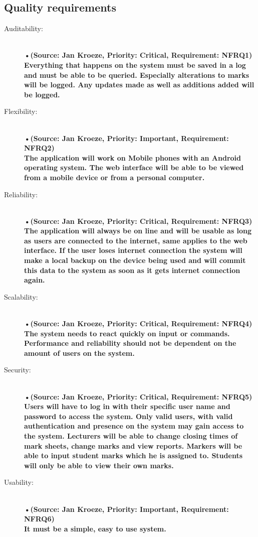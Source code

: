 \documentclass[12pt]{article}
\begin{document}
  \subsection{Quality requirements}
\begin{description}
  \item[Auditability:] \hfill  \\
  \textbf{•(Source: Jan Kroeze, Priority: Critical, Requirement: NFRQ1) \\
  Everything that happens on the system must be saved in a log and must be able to be queried. Especially alterations to marks will be logged. Any updates made as well as additions added will be logged.} \\
  \item[Flexibility:] \hfill \\
  \textbf{•(Source: Jan Kroeze, Priority: Important, Requirement: NFRQ2) \\
  The application will work on Mobile phones with an Android operating system. The web interface will be able to be viewed from a mobile device or from a personal computer.}\\
  \item[Reliability:] \hfill \\
  \textbf{•(Source: Jan Kroeze, Priority: Critical, Requirement: NFRQ3) \\
  The application will always be on line and will be usable as long as users are connected to the internet, same applies to the web interface. If the user loses internet connection the system will make a local backup on the device being used and will commit this data to the system as soon as it gets internet connection again.}\\
  \item[Scalability:] \hfill \\
  \textbf{•(Source: Jan Kroeze, Priority: Critical, Requirement: NFRQ4) \\
  The system needs to react quickly on input or commands. Performance and reliability should not be dependent on the amount of users on the system.}\\
  \item[Security:] \hfill \\
  \textbf{•(Source: Jan Kroeze, Priority: Critical, Requirement: NFRQ5) \\
  Users will have to log in with their specific user name and password to access the system. Only valid users, with valid authentication and presence on the system may gain access to the system. Lecturers will be able to change closing times of mark sheets, change marks and view reports. Markers will be able to input student marks which he is assigned to. Students will only be able to view their own marks.} \\
  \item[Usability:] \hfill \\
  \textbf{•(Source: Jan Kroeze, Priority: Important, Requirement: NFRQ6) \\
  It must be a simple, easy to use system.}
\end{description} 
\end{document}
